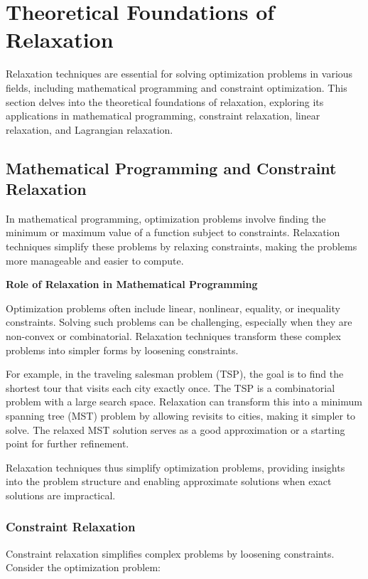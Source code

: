 \documentclass[12pt]{book} %
\begin{document}
\section{Theoretical Foundations of Relaxation}

Relaxation techniques are essential for solving optimization problems in various fields, including mathematical programming and constraint optimization. This section delves into the theoretical foundations of relaxation, exploring its applications in mathematical programming, constraint relaxation, linear relaxation, and Lagrangian relaxation.

\subsection{Mathematical Programming and Constraint Relaxation}

In mathematical programming, optimization problems involve finding the minimum or maximum value of a function subject to constraints. Relaxation techniques simplify these problems by relaxing constraints, making the problems more manageable and easier to compute.

\textbf{Role of Relaxation in Mathematical Programming}

Optimization problems often include linear, nonlinear, equality, or inequality constraints. Solving such problems can be challenging, especially when they are non-convex or combinatorial. Relaxation techniques transform these complex problems into simpler forms by loosening constraints.

For example, in the traveling salesman problem (TSP), the goal is to find the shortest tour that visits each city exactly once. The TSP is a combinatorial problem with a large search space. Relaxation can transform this into a minimum spanning tree (MST) problem by allowing revisits to cities, making it simpler to solve. The relaxed MST solution serves as a good approximation or a starting point for further refinement.

Relaxation techniques thus simplify optimization problems, providing insights into the problem structure and enabling approximate solutions when exact solutions are impractical.

\subsubsection{Constraint Relaxation}

Constraint relaxation simplifies complex problems by loosening constraints. Consider the optimization problem:
\end{document}
